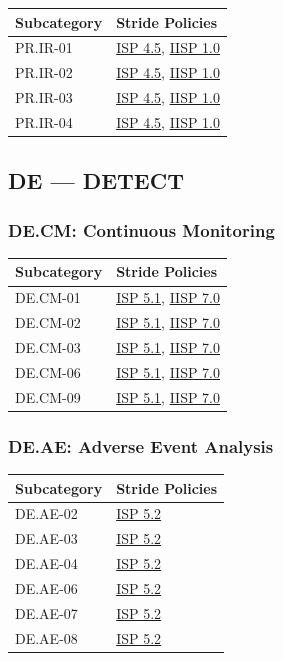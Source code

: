 \documentclass[11pt,landscape]{article}
\begin{document}
\begin{tabularx}{\textwidth}{|p{3.5cm}|X|}
\hline
\rowcolor{headgray} \textbf{Subcategory} & \textbf{Stride Policies} \\
\hline
PR.IR-01 & \hyperref[pol:ISP45]{ISP 4.5}, \hyperref[pol:IISP10]{IISP 1.0} \\
\hline
PR.IR-02 & \hyperref[pol:ISP45]{ISP 4.5}, \hyperref[pol:IISP10]{IISP 1.0} \\
\hline
PR.IR-03 & \hyperref[pol:ISP45]{ISP 4.5}, \hyperref[pol:IISP10]{IISP 1.0} \\
\hline
PR.IR-04 & \hyperref[pol:ISP45]{ISP 4.5}, \hyperref[pol:IISP10]{IISP 1.0} \\
\hline
\end{tabularx}

\subsection{DE --- DETECT}

\subsubsection{DE.CM: Continuous Monitoring}

\begin{tabularx}{\textwidth}{|p{3.5cm}|X|}
\hline
\rowcolor{headgray} \textbf{Subcategory} & \textbf{Stride Policies} \\
\hline
DE.CM-01 & \hyperref[pol:ISP51]{ISP 5.1}, \hyperref[pol:IISP70]{IISP 7.0} \\
\hline
DE.CM-02 & \hyperref[pol:ISP51]{ISP 5.1}, \hyperref[pol:IISP70]{IISP 7.0} \\
\hline
DE.CM-03 & \hyperref[pol:ISP51]{ISP 5.1}, \hyperref[pol:IISP70]{IISP 7.0} \\
\hline
DE.CM-06 & \hyperref[pol:ISP51]{ISP 5.1}, \hyperref[pol:IISP70]{IISP 7.0} \\
\hline
DE.CM-09 & \hyperref[pol:ISP51]{ISP 5.1}, \hyperref[pol:IISP70]{IISP 7.0} \\
\hline
\end{tabularx}

\subsubsection{DE.AE: Adverse Event Analysis}

\begin{tabularx}{\textwidth}{|p{3.5cm}|X|}
\hline
\rowcolor{headgray} \textbf{Subcategory} & \textbf{Stride Policies} \\
\hline
DE.AE-02 & \hyperref[pol:ISP52]{ISP 5.2} \\
\hline
DE.AE-03 & \hyperref[pol:ISP52]{ISP 5.2} \\
\hline
DE.AE-04 & \hyperref[pol:ISP52]{ISP 5.2} \\
\hline
DE.AE-06 & \hyperref[pol:ISP52]{ISP 5.2} \\
\hline
DE.AE-07 & \hyperref[pol:ISP52]{ISP 5.2} \\
\hline
DE.AE-08 & \hyperref[pol:ISP52]{ISP 5.2} \\
\hline
\end{tabularx}
\end{document}
